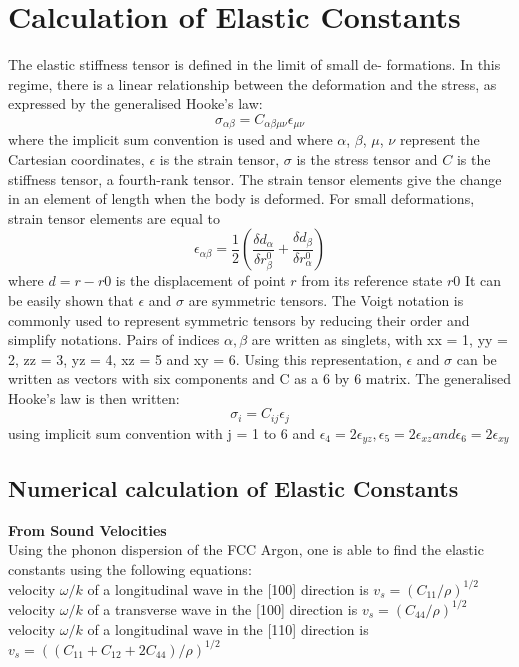 \documentclass[a4paper]{article}
\begin{document}
\section{Calculation of Elastic Constants}
The elastic stiffness tensor is defined in the limit of small de- formations. In this regime, there is a linear relationship between the deformation and the stress, as expressed by the generalised Hooke’s law:
\begin{equation}
    \sigma_{\alpha\beta} = C_{\alpha\beta\mu\nu} \epsilon_{\mu\nu}
\end{equation}
where the implicit sum convention is used and where $\alpha$, $\beta$, $\mu$, $\nu$ represent the Cartesian coordinates, $\epsilon$ is the strain tensor, $\sigma$ is the stress tensor and $C$ is the stiffness tensor, a fourth-rank tensor. The strain tensor elements give the change in an element of length when the body is deformed. For small deformations, strain tensor elements are equal to
\begin{equation}
    \epsilon_{\alpha\beta}=\frac{1}{2}\left(\frac{\delta d_{\alpha}}{\delta r_{\beta}^0}+\frac{\delta d_{\beta}}{\delta r_{\alpha}^0}\right)
\end{equation}
where $d = r−r0$ is the displacement of point $r$ from its reference state $r0$
It can be easily shown that $\epsilon$ and $\sigma$ are symmetric tensors. The Voigt notation is commonly used to represent symmetric tensors by reducing their order and simplify notations. Pairs of indices $\alpha, \beta$ are written as singlets, with xx = 1, yy = 2, zz = 3, yz = 4, xz = 5 and xy = 6. Using this representation, $\epsilon$ and $\sigma$ can be written as vectors with six components and C as a 6 by 6 matrix. The generalised Hooke’s law is then written:
\begin{equation}
    \sigma_i = C_{ij}\epsilon_j
\end{equation}
using implicit sum convention with j = 1 to 6 and $\epsilon_4 = 2\epsilon_{yz} , \epsilon_5 = 2\epsilon_{xz} and \epsilon_6 = 2\epsilon_{xy}$
\subsection{Numerical calculation of Elastic Constants}
\textbf{From Sound Velocities}\\

Using the phonon dispersion of the FCC Argon, one is able to find the elastic constants using the following equations:
\\
velocity $\omega/k$ of a longitudinal wave in the [100] direction is   $v_s = (C_{11}/\rho)^{1/2}$ 
\\
velocity $\omega/k$ of a transverse wave in the [100] direction is   $v_s = (C_{44}/\rho)^{1/2}$ 
\\
velocity $\omega/k$ of a longitudinal wave in the [110] direction is   $v_s = ((C_{11}+C_{12}+2C_{44})/\rho)^{1/2}$ 
\end{document}
